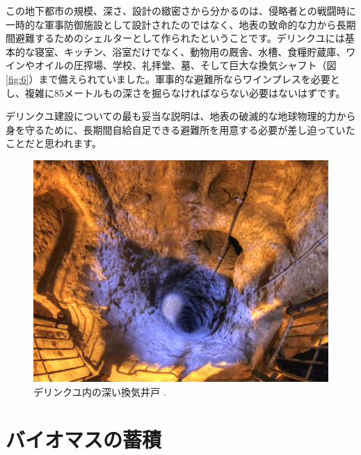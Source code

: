 \documentclass[10pt,twocolumn,letterpaper]{article}
\begin{document}
この地下都市の規模、深さ、設計の緻密さから分かるのは、侵略者との戦闘時に一時的な軍事防御施設として設計されたのではなく、地表の致命的な力から長期間避難するためのシェルターとして作られたということです。デリンクユには基本的な寝室、キッチン、浴室だけでなく、動物用の厩舎、水槽、食糧貯蔵庫、ワインやオイルの圧搾場、学校、礼拝堂、墓、そして巨大な換気シャフト（図\ref{fig:6}）まで備えられていました。軍事的な避難所ならワインプレスを必要とし、複雑に85メートルもの深さを掘らなければならない必要はないはずです。

デリンクユ建設についての最も妥当な説明は、地表の破滅的な地球物理的力から身を守るために、長期間自給自足できる避難所を用意する必要が差し迫っていたことだと思われます。

\begin{figure}[t]
\begin{center}
   \includegraphics[width=1\linewidth]{derinkuyu-air.jpg}
\end{center}
   \caption{デリンクユ内の深い換気井戸 \cite{53}.}
\label{fig:6}
\label{fig:onecol}
\end{figure}


\section{バイオマスの蓄積}
\end{document}
